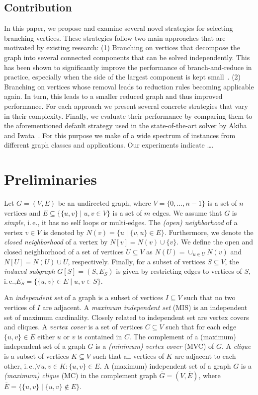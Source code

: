 \documentclass[a4paper,UKenglish,cleveref, autoref, thm-restate]{lipics-v2021}
\newcommand{\ie}{i.\,e.,\xspace}
\begin{document}
\subsection{Contribution}
In this paper, we propose and examine several novel strategies for selecting branching vertices. These strategies follow two main approaches that are motivated by existing research: (1) Branching on vertices that decompose the graph into several connected components that can be solved independently. This has been shown to significantly improve the performance of branch-and-reduce in practice, especially when the side of the largest component is kept small~\cite{alsahafy2020computing}. (2) Branching on vertices whose removal leads to reduction rules becoming applicable again. In turn, this leads to a smaller reduced graph and thus improved performance. For each approach we present several concrete strategies that vary in their complexity. Finally, we evaluate their performance by comparing them to the aforementioned default strategy used in the state-of-the-art solver by Akiba and Iwata~\cite{AkibaIwata}. For this purpose we make of a wide spectrum of instances from different graph classes and applications. Our experiments indicate \ldots.

\section{Preliminaries}
Let $G=(V,E)$ be an undirected graph, where $V = \{0, \ldots, n-1\}$ is a set of $n$ vertices and $E \subseteq  \{\{u,v\} \mid u,v \in V\}$ is a set of $m$ edges. 
We assume that $G$ is \emph{simple}, \ie it has no self loops or multi-edges.
The \emph{(open) neighborhood} of a vertex $v \in V$ is denoted by $N(v) = \{u \mid \{v,u\} \in E\}$.
Furthermore, we denote the \emph{closed neighborhood} of a vertex by $N[v]=N(v) \cup \{v\}$.
We define the open and closed neighborhood of a set of vertices $U \subseteq V$ as $N(U) = \cup_{u \in U} N(v)$ and $N[U] = N(U) \cup U$, respectively.
Finally, for a subset of vertices $S \subseteq V$, the \emph{induced subgraph} $G[S] = (S, E_S)$ is given by restricting edges to vertices of $S$, \ie $E_S = \{\{u,v\} \in E \mid u,v \in S\}$.

An \emph{independent set} of a graph is a subset of vertices $I \subseteq V$ such that no two vertices of $I$ are adjacent. 
A \emph{maximum independent set} (MIS) is an independent set of maximum cardinality.
Closely related to independent set are vertex covers and cliques.
A \emph{vertex cover} is a set of vertices $C \subseteq V$ such that for each edge $\{u,v\} \in E$ either $u$ or $v$ is contained in $C$.
The complement of a (maximum) independent set of a graph $G$ is a \emph{(minimum) vertex cover} (MVC) of $G$.
A \emph{clique} is a subset of vertices $K \subseteq V$ such that all vertices of $K$ are adjacent to each other, \ie $\forall u,v \in K: \{u,v\} \in E$.
A (maximum) independent set of a graph $G$ is a \emph{(maximum) clique} (MC) in the complement graph $\bar{G} = (V, \bar{E})$, where $\bar{E} = \{\{u,v\} \mid \{u,v\} \not\in E\}$.
\end{document}
